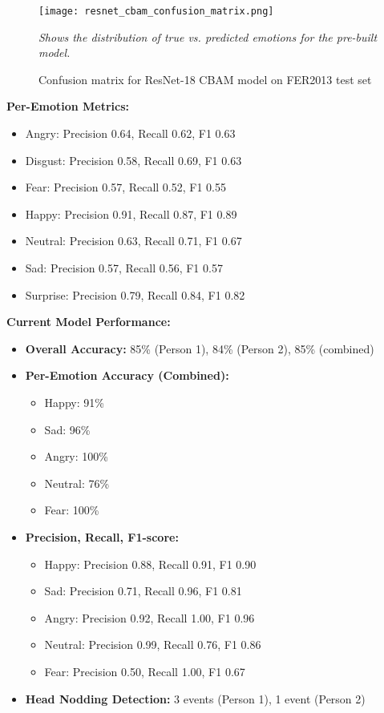 \documentclass[12pt]{article}
\begin{document}
\begin{figure}[h!]
    \centering
    \texttt{[image: resnet\_cbam\_confusion\_matrix.png]}
    \caption{Confusion matrix for ResNet-18 CBAM model on FER2013 test set}
    \textit{Shows the distribution of true vs. predicted emotions for the pre-built model.}
\end{figure}

\textbf{Per-Emotion Metrics:}
\begin{itemize}
    \item Angry: Precision 0.64, Recall 0.62, F1 0.63
    \item Disgust: Precision 0.58, Recall 0.69, F1 0.63
    \item Fear: Precision 0.57, Recall 0.52, F1 0.55
    \item Happy: Precision 0.91, Recall 0.87, F1 0.89
    \item Neutral: Precision 0.63, Recall 0.71, F1 0.67
    \item Sad: Precision 0.57, Recall 0.56, F1 0.57
    \item Surprise: Precision 0.79, Recall 0.84, F1 0.82
\end{itemize}


\textbf{Current Model Performance:}
\begin{itemize}
    \item \textbf{Overall Accuracy:} 85\% (Person 1), 84\% (Person 2), 85\% (combined)
    \item \textbf{Per-Emotion Accuracy (Combined):}
    \begin{itemize}
        \item Happy: 91\%
        \item Sad: 96\%
        \item Angry: 100\%
        \item Neutral: 76\%
        \item Fear: 100\%
    \end{itemize}
    \item \textbf{Precision, Recall, F1-score:}
    \begin{itemize}
        \item Happy: Precision 0.88, Recall 0.91, F1 0.90
        \item Sad: Precision 0.71, Recall 0.96, F1 0.81
        \item Angry: Precision 0.92, Recall 1.00, F1 0.96
        \item Neutral: Precision 0.99, Recall 0.76, F1 0.86
        \item Fear: Precision 0.50, Recall 1.00, F1 0.67
    \end{itemize}
    \item \textbf{Head Nodding Detection:} 3 events (Person 1), 1 event (Person 2)
\end{itemize}
\end{document}
